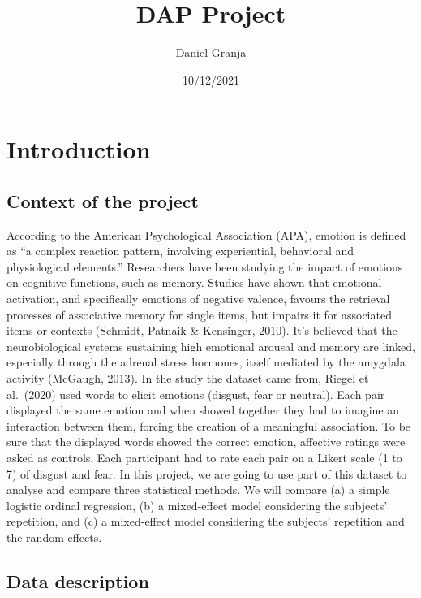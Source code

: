 \documentclass[
]{article}
\title{DAP Project}
\author{Daniel Granja}
\date{10/12/2021}
\begin{document}
\maketitle

\hypertarget{introduction}{%
\section{Introduction}\label{introduction}}

\hypertarget{context-of-the-project}{%
\subsection{Context of the project}\label{context-of-the-project}}

According to the American Psychological Association (APA), emotion is
defined as ``a complex reaction pattern, involving experiential,
behavioral and physiological elements.'' Researchers have been studying
the impact of emotions on cognitive functions, such as memory. Studies
have shown that emotional activation, and specifically emotions of
negative valence, favours the retrieval processes of associative memory
for single items, but impairs it for associated items or contexts
(Schmidt, Patnaik \& Kensinger, 2010). It's believed that the
neurobiological systems sustaining high emotional arousal and memory are
linked, especially through the adrenal stress hormones, itself mediated
by the amygdala activity (McGaugh, 2013). In the study the dataset came
from, Riegel et al.~(2020) used words to elicit emotions (disgust, fear
or neutral). Each pair displayed the same emotion and when showed
together they had to imagine an interaction between them, forcing the
creation of a meaningful association. To be sure that the displayed
words showed the correct emotion, affective ratings were asked as
controls. Each participant had to rate each pair on a Likert scale (1 to
7) of disgust and fear. In this project, we are going to use part of
this dataset to analyse and compare three statistical methods. We will
compare (a) a simple logistic ordinal regression, (b) a mixed-effect
model considering the subjects' repetition, and (c) a mixed-effect model
considering the subjects' repetition and the random effects.

\hypertarget{data-description}{%
\subsection{Data description}\label{data-description}}
\end{document}
